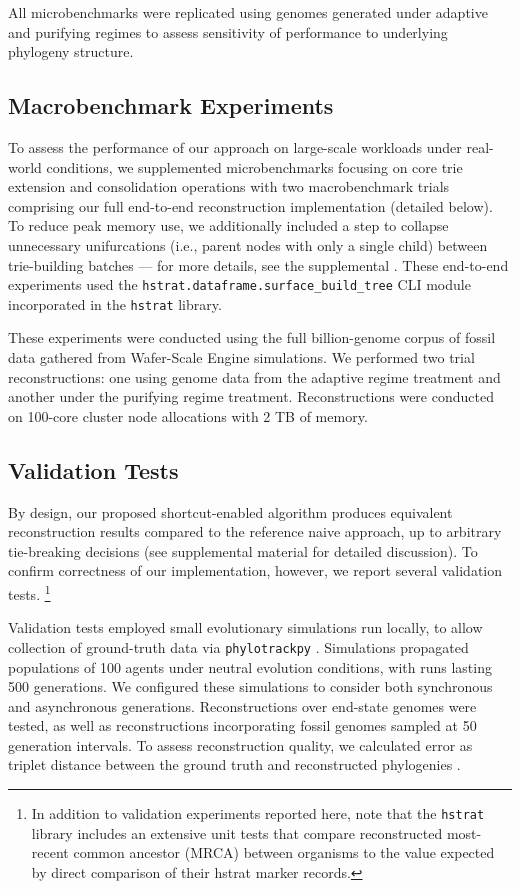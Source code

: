 All microbenchmarks were replicated using genomes generated under adaptive and purifying regimes to assess sensitivity of performance to underlying phylogeny structure.

\subsection{Macrobenchmark Experiments}

To assess the performance of our approach on large-scale workloads under real-world conditions, we supplemented microbenchmarks focusing on core trie extension and consolidation operations with two macrobenchmark trials comprising our full end-to-end reconstruction implementation (detailed below).
To reduce peak memory use, we additionally included a step to collapse unnecessary unifurcations (i.e., parent nodes with only a single child) between trie-building batches --- for more details, see the supplemental \citep{supplemental}.
These end-to-end experiments used the \texttt{hstrat.dataframe.surface\_build\_tree} CLI module incorporated in the \texttt{hstrat} library.

These experiments were conducted using the full billion-genome corpus of fossil data gathered from Wafer-Scale Engine simulations.
We performed two trial reconstructions: one using genome data from the adaptive regime treatment and another under the purifying regime treatment.
Reconstructions were conducted on 100-core cluster node allocations with 2 TB of memory.

\subsection{Validation Tests}

By design, our proposed shortcut-enabled algorithm produces equivalent reconstruction results compared to the reference naive approach, up to arbitrary tie-breaking decisions (see supplemental material \citep{supplemental} for detailed discussion).
To confirm correctness of our implementation, however, we report several validation tests.%
\footnote{In addition to validation experiments reported here, note that the \texttt{hstrat} library includes an extensive unit tests that compare reconstructed most-recent common ancestor (MRCA) between organisms to the value expected by direct comparison of their hstrat marker records.}

Validation tests employed small evolutionary simulations run locally, to allow collection of ground-truth data via \texttt{phylotrackpy} \citep{dolson2024phylotrack}.
Simulations propagated populations of 100 agents under neutral evolution conditions, with runs lasting 500 generations.
We configured these simulations to consider both synchronous and asynchronous generations.
Reconstructions over end-state genomes were tested, as well as reconstructions incorporating fossil genomes sampled at 50 generation intervals.
To assess reconstruction quality, we calculated error as triplet distance between the ground truth and reconstructed phylogenies \citep{critchlow1996triples}.

